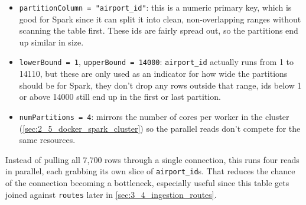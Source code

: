 \begin{itemize}
	\item \texttt{partitionColumn = "airport\_id"}: this is a numeric primary
	      key, which is good for Spark since it can split it into clean,
	      non-overlapping ranges without scanning the table first. These ids
	      are fairly spread out, so the partitions end up similar in size.
	\item \texttt{lowerBound = 1}, \texttt{upperBound = 14000}:
	      \texttt{airport\_id} actually runs from 1 to 14110, but these are
	      only used as an indicator for how wide the partitions should be for
	      Spark, they don't drop any rows outside that range, ids below 1 or
	      above 14000 still end up in the first or last partition.
	\item \texttt{numPartitions = 4}: mirrors the number of cores per worker
	      in the cluster (\cref{sec:2_5_docker_spark_cluster}) so the parallel reads don't compete for
	      the same resources.
\end{itemize}

\par
Instead of pulling all 7{,}700 rows through a single connection, this runs
four reads in parallel, each grabbing its own slice of \texttt{airport\_id}s.
That reduces the chance of the connection becoming a bottleneck, especially
useful since this table gets joined against \texttt{routes} later in
\cref{sec:3_4_ingestion_routes}.
